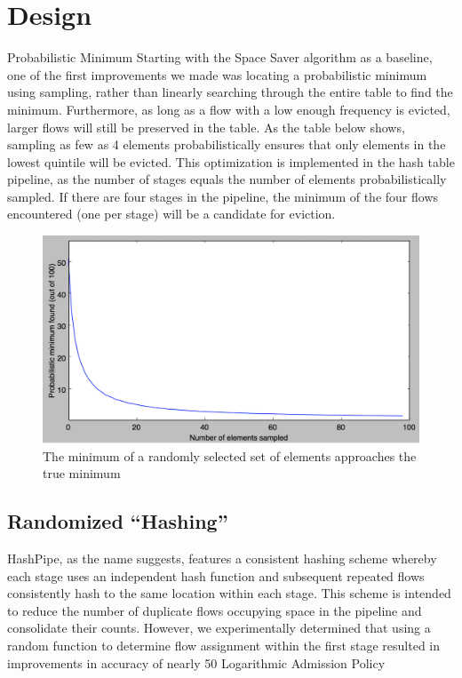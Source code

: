 \section{Design}
\label{sec:design}

Probabilistic Minimum
Starting with the Space Saver algorithm as a baseline, one of the first improvements we made was locating a probabilistic minimum using sampling, rather than linearly searching through the entire table to find the minimum. Furthermore, as long as a flow with a low enough frequency is evicted, larger flows will still be preserved in the table. As the table below shows, sampling as few as 4 elements probabilistically ensures that only elements in the lowest quintile will be evicted. This optimization is implemented in the hash table pipeline, as the number of stages equals the number of elements probabilistically sampled. If there are four stages in the pipeline, the minimum of the four flows encountered (one per stage) will be a candidate for eviction. 
 
\begin{figure}[t]
  \centering
    \includegraphics[scale=0.32]{probMin}
     \caption{The minimum of a randomly selected set of elements approaches the true minimum}
     \label{fig:bp-image}
\end{figure}

\subsection{Randomized ``Hashing''}
HashPipe, as the name suggests, features a consistent hashing scheme whereby each stage uses an independent hash function and subsequent repeated flows consistently hash to the same location within each stage. This scheme is intended to reduce the number of duplicate flows occupying space in the pipeline and consolidate their counts. However, we experimentally determined that using a random function to determine flow assignment within the first stage resulted in improvements in accuracy of nearly 50%
Logarithmic Admission Policy

